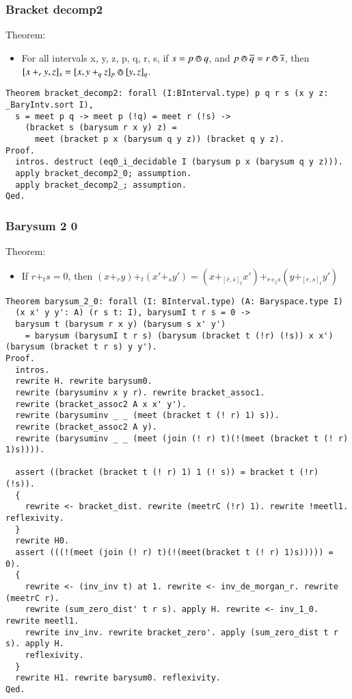 \documentclass[a4paper,10pt]{article} %
\newcommand{\meet}{\circledwedge}
\begin{document}
\subsubsection{Bracket decomp2}
Theorem:
\begin{itemize}
    \item For all intervals x, y, z, p, q, r, s, if $s = p \meet q$, and $p \meet \overline{q} = r \meet \overline{s}$, then $[x + _ry, z]_s = [x, y + _qz]_p \meet [y, z]_q$.
\end{itemize}
\begin{lstlisting}
Theorem bracket_decomp2: forall (I:BInterval.type) p q r s (x y z: _BaryIntv.sort I),
  s = meet p q -> meet p (!q) = meet r (!s) ->  
    (bracket s (barysum r x y) z) = 
      meet (bracket p x (barysum q y z)) (bracket q y z).
Proof.
  intros. destruct (eq0_i_decidable I (barysum p x (barysum q y z))).
  apply bracket_decomp2_0; assumption.
  apply bracket_decomp2_; assumption.
Qed.
\end{lstlisting}

\subsubsection{Barysum 2 0}
Theorem:
\begin{itemize}
    \item If $r + _ts = 0$, then $(x + _ry) + _t(x' + _sy') = (x + _{[\overline{r}, \overline{s}]_t}x') + _{r + _ts}(y + _{[r, s]_t}y')$
\end{itemize}
\begin{lstlisting}
Theorem barysum_2_0: forall (I: BInterval.type) (A: Baryspace.type I) 
  (x x' y y': A) (r s t: I), barysumI t r s = 0 -> 
  barysum t (barysum r x y) (barysum s x' y')
    = barysum (barysumI t r s) (barysum (bracket t (!r) (!s)) x x') (barysum (bracket t r s) y y').
Proof.
  intros. 
  rewrite H. rewrite barysum0. 
  rewrite (barysuminv x y r). rewrite bracket_assoc1.
  rewrite (bracket_assoc2 A x x' y'). 
  rewrite (barysuminv _ _ (meet (bracket t (! r) 1) s)). 
  rewrite (bracket_assoc2 A y).
  rewrite (barysuminv _ _ (meet (join (! r) t)(!(meet (bracket t (! r) 1)s)))).

  assert ((bracket (bracket t (! r) 1) 1 (! s)) = bracket t (!r) (!s)).
  {
    rewrite <- bracket_dist. rewrite (meetrC (!r) 1). rewrite !meetl1. reflexivity.
  }
  rewrite H0.
  assert (((!(meet (join (! r) t)(!(meet(bracket t (! r) 1)s))))) = 0).
  {
    rewrite <- (inv_inv t) at 1. rewrite <- inv_de_morgan_r. rewrite (meetrC r). 
    rewrite (sum_zero_dist' t r s). apply H. rewrite <- inv_1_0.  rewrite meetl1.
    rewrite inv_inv. rewrite bracket_zero'. apply (sum_zero_dist t r s). apply H.
    reflexivity.
  }
  rewrite H1. rewrite barysum0. reflexivity.
Qed.
\end{lstlisting}
\end{document}
